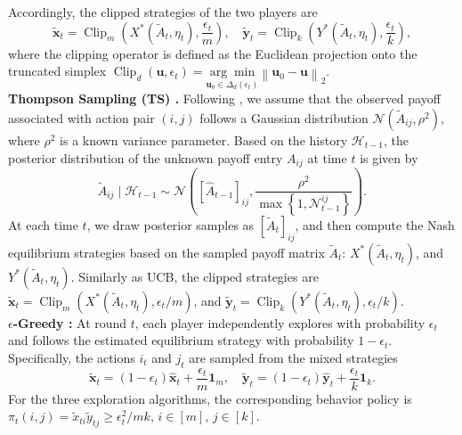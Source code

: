 \documentclass[12pt]{article}
\begin{document}
Accordingly, the clipped strategies of the two players are
\[
    \widetilde{\bm{x}}_t =
    \operatorname{Clip}_m
    \left(
        X^\ast(\widetilde{A}_{t},\eta_t),
        \frac{\epsilon_t}{m}
    \right), \quad 
    \widetilde{\bm{y}}_t =
    \operatorname{Clip}_k
    \left(
        Y^\ast(\widetilde{A}_{t},\eta_t),
        \frac{\epsilon_t}{k}
    \right),
\] where the clipping operator is defined as the Euclidean projection onto the 
truncated simplex 
$\operatorname{Clip}_d(\bm{u},\epsilon_t) =
    \underset{\bm{u}_0\in\Delta_d(\epsilon_t)}
    {\arg\min}
    \left\|
        \bm{u}_0 -\bm{u}
    \right\|_2.$ \\
\textbf{Thompson Sampling (TS) \citep{agrawal2013thompson}.}
Following \citet{shen2024doubly}, we assume that the observed payoff associated with action pair $(i,j)$ follows a Gaussian distribution $\mathcal{N}(\widetilde{A}_{ij},\rho^2)$, where $\rho^2$ is a known variance parameter. Based on the history $\mathcal{H}_{t-1}$, the posterior distribution of the unknown payoff entry $A_{ij}$ at time $t$ is given by
\begin{equation}
  \widetilde{A}_{ij} \mid \mathcal{H}_{t-1}
    \sim
    \mathcal{N}
    \left(
        [\widehat{A}_{t-1}]_{ij},
        \frac{\rho^2}{
            \max\left\{1,\mathcal{N}_{t-1}^{ij}\right\}
        }
    \right).
\end{equation}
At each time $t$, we draw posterior samples as $[\widetilde{A}_t]_{ij}$, and then compute the Nash equilibrium strategies based on the sampled payoff matrix $\widetilde{A}_t$: $X^\ast(\widetilde{A}_t,\eta_t)$, and $Y^\ast(\widetilde{A}_t,\eta_t)$.
Similarly as UCB, the clipped strategies are $\widetilde{\bm{x}}_t=\operatorname{Clip}_m \left(X^\ast(\widetilde{A}_{t},\eta_t), \epsilon_t/m \right)$, and $\widetilde{\bm{y}}_t=\operatorname{Clip}_k \left( Y^\ast(\widetilde{A}_{t},\eta_t), \epsilon_t/k \right)$. \\
\textbf{$\epsilon$-Greedy \citep{sutton1998reinforcement}:}
At round $t$, each player independently explores with probability $\epsilon_t$ and follows the estimated equilibrium strategy with probability $1-\epsilon_t$. Specifically, the actions $i_t$ and $j_t$ are sampled from the mixed strategies 
\begin{equation*} 
\widetilde{\bm{x}}_t = (1-\epsilon_t)\widehat{\bm{x}}_t + \frac{\epsilon_t}{m}\bm{1}_m, \quad 
\widetilde{\bm{y}}_t = (1-\epsilon_t)\widehat{\bm{y}}_t + \frac{\epsilon_t}{k}\bm{1}_k.  
\end{equation*}
For the three exploration algorithms, the corresponding behavior policy is $\pi_t(i,j) = \widetilde{x}_{ti}\widetilde{y}_{tj} \ge \epsilon_t^2/mk, \, i\in[m],\, j\in[k].$
\end{document}

